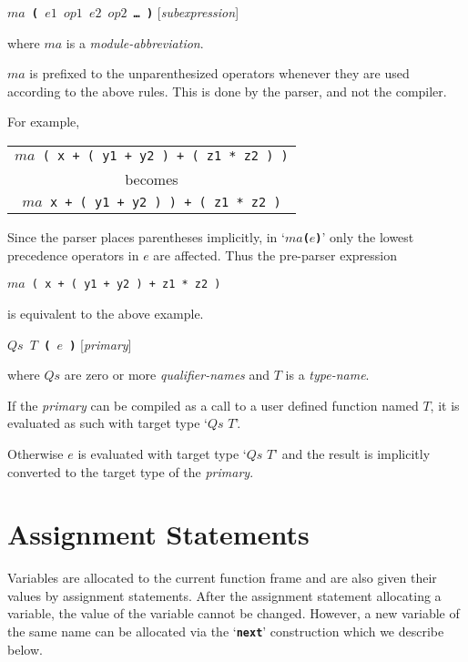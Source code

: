 \documentclass[12pt]{article}
\newcommand{\TT}[1]{{\tt \bfseries #1}}
\newenvironment{indpar}[1][0.3in]%
	{\begin{list}{}%
		     {\setlength{\itemsep}{0in}%
		      \setlength{\topsep}{0in}%
		      \setlength{\parsep}{1ex}%
		      \setlength{\labelwidth}{#1}%
		      \setlength{\leftmargin}{#1}%
		      \addtolength{\leftmargin}{\labelsep}}%
	 \item}%
	{\end{list}}
\begin{document}
\TT{$ma$ ( $e1$ $op1$ $e2$ $op2$ \ldots{} )}
\hfill [{\em subexpression}]
\label{MODULE-ABBREVIATION-SEMANTICS}
\begin{indpar}
where $ma$ is a {\em module-abbreviation}.

$ma$ is prefixed to the unparenthesized
operators whenever they are used according to the above
rules.  This is done by the parser, and not the compiler.

For example,
\begin{center}
\begin{tabular}{c}
{\tt $ma$ ( x + ( y1 + y2 ) + ( z1 * z2 ) )} \\
becomes \\
{\tt $ma$ x + ( y1 + y2 ) ) + ( z1 * z2 )}
\end{tabular}
\end{center}

Since the parser places parentheses implicitly, in `\TT{$ma$($e$)}'
only the lowest precedence operators in $e$ are affected.
Thus the pre-parser expression
\begin{center}
{\tt $ma$ ( x + ( y1 + y2 ) + z1 * z2 )} \\
\end{center}
is equivalent to the above example.

\end{indpar}

\TT{$Qs$ $T$ ( $e$ )}
\hfill [{\em primary}]
\begin{indpar}
where $Qs$ are zero or more {\em qualifier-names} and $T$ is a {\em type-name}.

If the {\em primary} can be compiled as a call to a
user defined function named $T$, it is evaluated as such with
target type `$Qs$ $T$'.

Otherwise $e$ is evaluated with target type `$Qs$ $T$'
and the result is implicitly
converted to the target type of the {\em primary}.
\end{indpar}

\section{Assignment Statements}
\label{ASSIGNMENT-STATEMENTS}

Variables are allocated to the current function frame
and are also given their values by assignment statements.
After the assignment statement allocating a variable,
the value of the variable cannot be changed.  However,
a new variable of the same name can be allocated via
the `\TT{next}' construction which we describe below.
\end{document}
